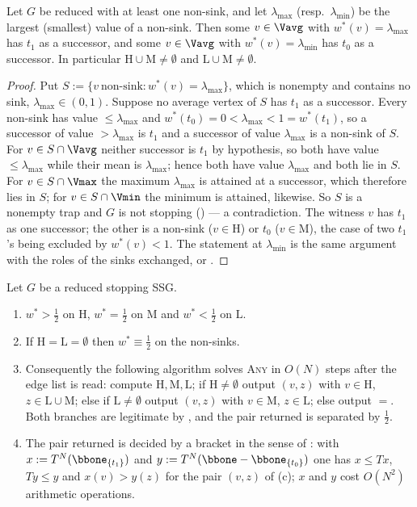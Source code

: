 \begin{lemma}\label{lem:wo-extreme}
Let $G$ be reduced with at least one non-sink, and let
$\lambda_{\max}$ (resp.\ $\lambda_{\min}$) be the largest (smallest) value of a
non-sink. Then some $v\in\Vavg$ with $w^\ast(v)=\lambda_{\max}$ has $t_1$ as a
successor, and some $v\in\Vavg$ with $w^\ast(v)=\lambda_{\min}$ has $t_0$ as a
successor. In particular $\mathrm H\cup\mathrm M\ne\emptyset$ and
$\mathrm L\cup\mathrm M\ne\emptyset$.
\end{lemma}

\begin{proof}
Put $S:=\{v\ \text{non-sink}:w^\ast(v)=\lambda_{\max}\}$, which is nonempty and
contains no sink, $\lambda_{\max}\in(0,1)$. Suppose no average vertex of $S$
has $t_1$ as a successor. Every non-sink has value $\le\lambda_{\max}$ and
$w^\ast(t_0)=0<\lambda_{\max}<1=w^\ast(t_1)$, so a successor of value
$>\lambda_{\max}$ is $t_1$ and a successor of value $\lambda_{\max}$ is a
non-sink of $S$. For $v\in S\cap\Vavg$ neither successor is $t_1$ by
hypothesis, so both have value $\le\lambda_{\max}$ while their mean is
$\lambda_{\max}$; hence both have value $\lambda_{\max}$ and both lie in $S$.
For $v\in S\cap\Vmax$ the maximum $\lambda_{\max}$ is attained at a successor,
which therefore lies in $S$; for $v\in S\cap\Vmin$ the minimum is attained,
likewise. So $S$ is a nonempty trap and $G$ is not stopping
() --- a contradiction. The witness $v$ has $t_1$ as one
successor; the other is a non-sink ($v\in\mathrm H$) or $t_0$
($v\in\mathrm M$), the case of two $t_1$'s being excluded by $w^\ast(v)<1$.
The statement at $\lambda_{\min}$ is the same argument with the roles of the
sinks exchanged, or .
\end{proof}

\begin{theorem}\label{thm:wo-free-pair}
Let $G$ be a reduced stopping SSG.
\begin{enumerate}[label=(\alph*),leftmargin=2.2em]
\item $w^\ast>\tfrac12$ on $\mathrm H$, $w^\ast=\tfrac12$ on $\mathrm M$ and
  $w^\ast<\tfrac12$ on $\mathrm L$.
\item If $\mathrm H=\mathrm L=\emptyset$ then $w^\ast\equiv\tfrac12$ on the
  non-sinks.
\item Consequently the following algorithm solves \textsc{Any} in $O(N)$ steps
  after the edge list is read: compute $\mathrm H,\mathrm M,\mathrm L$; if
  $\mathrm H\ne\emptyset$ output $(v,z)$ with $v\in\mathrm H$,
  $z\in\mathrm L\cup\mathrm M$; else if $\mathrm L\ne\emptyset$ output $(v,z)$
  with $v\in\mathrm M$, $z\in\mathrm L$; else output $=$. Both branches are
  legitimate by , and the pair returned is separated by
  $\tfrac12$.
\item The pair returned is decided by a bracket in the sense of
  : with $x:=T^{N}(\bbone_{\{t_1\}})$ and
  $y:=T^{N}(\bbone-\bbone_{\{t_0\}})$ one has $x\le Tx$, $Ty\le y$ and
  $x(v)>y(z)$ for the pair $(v,z)$ of (c); $x$ and $y$ cost $O(N^{2})$
  arithmetic operations.
\end{enumerate}
\end{theorem}

